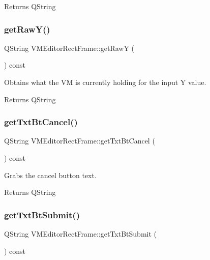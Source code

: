 \begin{DoxyReturn}{Returns}
Q\+String 
\end{DoxyReturn}
\mbox{\label{class_v_m_editor_rect_frame_a46d9f854d0ffbac7f7e58f115da98ef0}} 
\subsubsection{\texorpdfstring{getRawY()}{getRawY()}}
{\footnotesize\ttfamily Q\+String V\+M\+Editor\+Rect\+Frame\+::get\+RawY (\begin{DoxyParamCaption}{ }\end{DoxyParamCaption}) const}



Obtains what the VM is currently holding for the input Y value. 

\begin{DoxyReturn}{Returns}
Q\+String 
\end{DoxyReturn}
\mbox{\label{class_v_m_editor_rect_frame_aef01144aec98320cbd4699140bc19d41}} 
\subsubsection{\texorpdfstring{getTxtBtCancel()}{getTxtBtCancel()}}
{\footnotesize\ttfamily Q\+String V\+M\+Editor\+Rect\+Frame\+::get\+Txt\+Bt\+Cancel (\begin{DoxyParamCaption}{ }\end{DoxyParamCaption}) const}



Grabs the cancel button text. 

\begin{DoxyReturn}{Returns}
Q\+String 
\end{DoxyReturn}
\mbox{\label{class_v_m_editor_rect_frame_af0fbf30acf7e87c5ab5511d51d6b0714}} 
\subsubsection{\texorpdfstring{getTxtBtSubmit()}{getTxtBtSubmit()}}
{\footnotesize\ttfamily Q\+String V\+M\+Editor\+Rect\+Frame\+::get\+Txt\+Bt\+Submit (\begin{DoxyParamCaption}{ }\end{DoxyParamCaption}) const}



